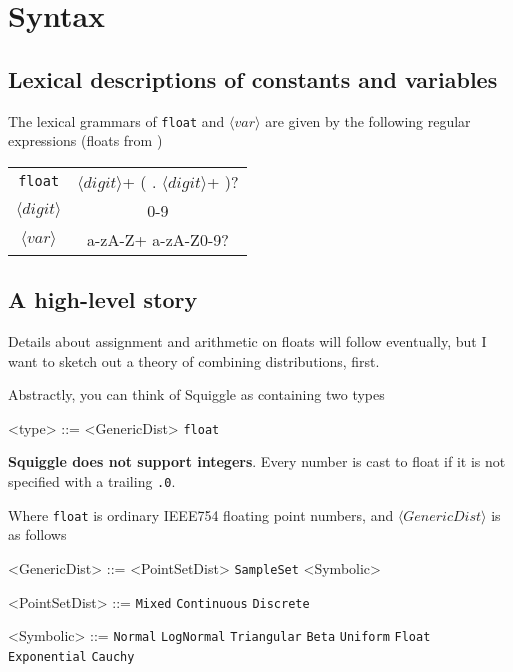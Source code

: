 \documentclass[../main.tex]{subfiles}
\begin{document}
\section{Syntax}\label{section:syntax}

\subsection{Lexical descriptions of constants and variables}
The lexical grammars of \texttt{float} and $\langle \textit{var} \rangle$ are given by the following regular expressions (floats from \cite{@CraftingInterpreters, Appendix I})

\begin{tabular}{ c c }
  \texttt{float} & $\langle digit \rangle$+ ( . $\langle digit \rangle$+ )? \\
  $\langle digit \rangle$ & 0-9 \\
  $\langle var \rangle$ & a-zA-Z+ a-zA-Z0-9?
\end{tabular}\label{regex:float}


\subsection{A high-level story}

Details about assignment and arithmetic on floats will follow eventually, but I want to sketch out a theory of combining distributions, first.

Abstractly, you can think of Squiggle as containing two types
\begin{grammar}
  <type> ::= <GenericDist> \alt \texttt{float}
\end{grammar}\label{gram:type}


\textbf{Squiggle does not support integers}. Every number is cast to float if it is not specified with a trailing \texttt{.0}.

Where \texttt{float} is ordinary IEEE754 floating point numbers, and $\langle \textit{GenericDist} \rangle$ is as follows

\begin{grammar}
  <GenericDist> ::= <PointSetDist> \alt \texttt{SampleSet} \alt <Symbolic>

  <PointSetDist> ::= \texttt{Mixed} \alt \texttt{Continuous} \alt \texttt{Discrete}

  <Symbolic> ::= \texttt{Normal} \alt \texttt{LogNormal} \alt \texttt{Triangular} \alt \texttt{Beta} \alt \texttt{Uniform} \alt \texttt{Float} \alt \texttt{Exponential} \alt \texttt{Cauchy}
\end{grammar}\label{gram:gendist}
\end{document}
